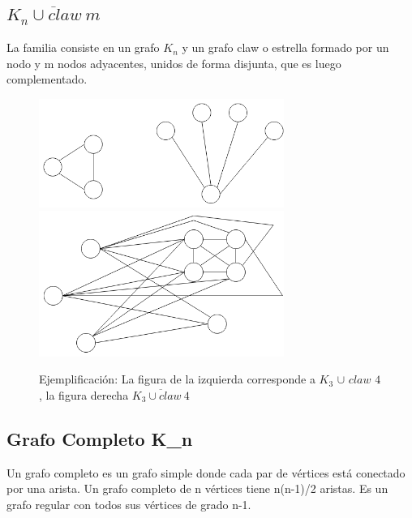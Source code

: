 \subsection{$\overline{K_n \cup claw \: m}$}
La familia consiste en un grafo $K_n$ y un grafo claw o estrella formado por un nodo y m nodos adyacentes, 
unidos de forma disjunta, que es luego complementado.
\begin{figure}[H]
\includegraphics[width=80mm]{K3UC4.png}
\includegraphics[width=80mm]{K3UC4Complemento.png}
\caption{Ejemplificación: La figura de la izquierda corresponde a $K_3$ $\cup$ $claw$ $4$, 
la figura derecha $\overline{K_3 \cup claw \: 4}$}
\label{overflow}
\end{figure}

\subsection{Grafo Completo K_n}
Un grafo completo es un grafo simple donde cada par de vértices está conectado por una arista.
Un grafo completo de n vértices tiene n(n-1)/2 aristas.
Es un grafo regular con todos sus vértices de grado n-1.

